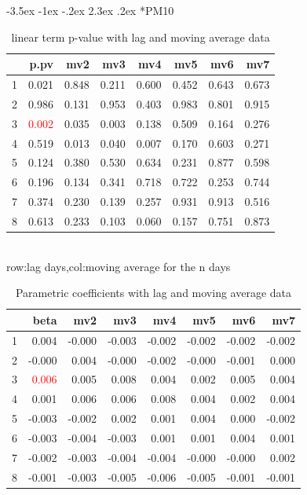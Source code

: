 \documentclass[a4paper, 12pt]{article}
\makeatletter
\def\large{\fontsize{14}{20}\selectfont}
\renewcommand\subsection{\@startsection {subsection}{1}{\z@}%
                                   {-3.5ex \@plus -1ex \@minus -.2ex}%
                                   {2.3ex \@plus.2ex}%
                                   {\centering\normalfont\large\bfseries}}
\makeatother
\begin{document}
\subsection*{PM10}
\begin{table}[h]
\centering
\caption{linear term p-value with lag and moving average data}
\begin{tabular}{rrrrrrrr}
  \hline
 & p.pv & mv2 & mv3 & mv4 & mv5 & mv6 & mv7 \\
  \hline
1 & 0.021 & 0.848 & 0.211 & 0.600 & 0.452 & 0.643 & 0.673 \\
  2 & 0.986 & 0.131 & 0.953 & 0.403 & 0.983 & 0.801 & 0.915 \\
  3 & \textcolor{red}{0.002} & 0.035 & 0.003 & 0.138 & 0.509 & 0.164 & 0.276 \\
  4 & 0.519 & 0.013 & 0.040 & 0.007 & 0.170 & 0.603 & 0.271 \\
  5 & 0.124 & 0.380 & 0.530 & 0.634 & 0.231 & 0.877 & 0.598 \\
  6 & 0.196 & 0.134 & 0.341 & 0.718 & 0.722 & 0.253 & 0.744 \\
  7 & 0.374 & 0.230 & 0.139 & 0.257 & 0.931 & 0.913 & 0.516 \\
  8 & 0.613 & 0.233 & 0.103 & 0.060 & 0.157 & 0.751 & 0.873 \\
   \hline
\end{tabular}
\\row:lag days,col:moving average for the n days
\end{table}

\begin{table}[h]
\centering
\caption{Parametric coefficients with lag and moving average data}
\begin{tabular}{rrrrrrrr}
  \hline
 & beta & mv2 & mv3 & mv4 & mv5 & mv6 & mv7 \\
  \hline
1 & 0.004 & -0.000 & -0.003 & -0.002 & -0.002 & -0.002 & -0.002 \\
  2 & -0.000 & 0.004 & -0.000 & -0.002 & -0.000 & -0.001 & 0.000 \\
  3 & \textcolor{red}{0.006} & 0.005 & 0.008 & 0.004 & 0.002 & 0.005 & 0.004 \\
  4 & 0.001 & 0.006 & 0.006 & 0.008 & 0.004 & 0.002 & 0.004 \\
  5 & -0.003 & -0.002 & 0.002 & 0.001 & 0.004 & 0.000 & -0.002 \\
  6 & -0.003 & -0.004 & -0.003 & 0.001 & 0.001 & 0.004 & 0.001 \\
  7 & -0.002 & -0.003 & -0.004 & -0.004 & -0.000 & -0.000 & 0.002 \\
  8 & -0.001 & -0.003 & -0.005 & -0.006 & -0.005 & -0.001 & -0.001 \\
   \hline
\end{tabular}
\end{table}
\clearpage
\end{document}

